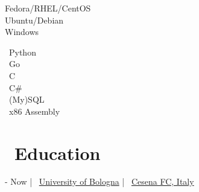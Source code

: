\documentclass{article}
\begin{document}
\begin{paracol}{2}
\begin{tcolorbox}[title=\faServer \ Operating Systems,colback=white,arc=0pt]
    \textcolor[HTML]{EE0000}{\faRedhat} Fedora/RHEL/CentOS \\
    \textcolor[HTML]{E95420}{\faUbuntu} Ubuntu/Debian \\
    \textcolor[HTML]{0078D6}{\faWindows} Windows
\end{tcolorbox}

\begin{tcolorbox}[title=\faCode \ Programming,colback=white,arc=0pt]
    \faPython \ Python \\
    \faGoogle \ Go \\
    \faFileCode \ C \\
    \faMicrosoft \ C\# \\
    \faDatabase \ (My)SQL \\
    \faMicrochip \ x86 Assembly
\end{tcolorbox}

\vspace{45pt}
\begin{center}
    \hypersetup{urlcolor=black}
\end{center}
\vspace{45pt}

\switchcolumn

\maketitle

%
%

\vfill

\section*{\faGraduationCap \ Education}

\begin{tcolorbox}[
    title=\faBookOpen \ \href
        {https://corsi.unibo.it/1cycle/ComputerScienceEngineering}
        {Bachelor in Computer Science and Engineering}
    ,
    colback=white,
    arc=0pt
]
     - Now \hfill | \hfill
    \faUniversity \ \href{https://www.unibo.it/en/}{University of Bologna} \hfill | \hfill
    \faCity \ \href{https://www.openstreetmap.org/relation/9713588}{Cesena FC, Italy}
\end{tcolorbox}


\end{paracol}
\end{document}
